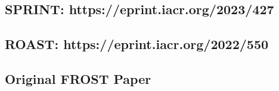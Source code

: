 \newpage

\subsection{SPRINT: https://eprint.iacr.org/2023/427}

%

\newpage

\subsection{ROAST: https://eprint.iacr.org/2022/550}

%
%
%
%

\newpage

\subsection{Original FROST Paper}

